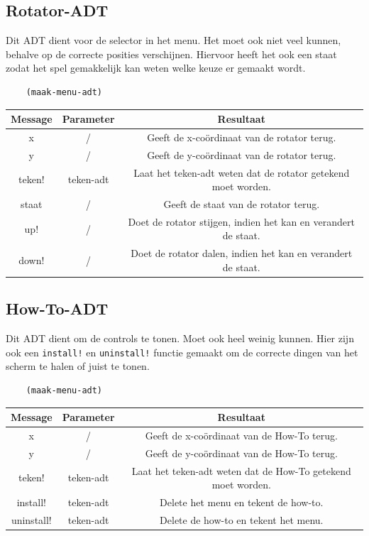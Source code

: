 \documentclass[]{article}
\begin{document}
\subsection{Rotator-ADT}
Dit ADT dient voor de selector in het menu. Het moet ook niet veel kunnen, behalve op de correcte posities verschijnen. Hiervoor heeft het ook een staat zodat het spel gemakkelijk kan weten welke keuze er gemaakt wordt. 
\begin{center}
	\begin{lstlisting}
	(maak-menu-adt)
	\end{lstlisting}
	\begin{tabular}{|c|c|c|}
		\hline  \textbf{Message} &\textbf{Parameter} & \textbf{Resultaat}  \\
			\hline x & /&Geeft de x-co\"{o}rdinaat van de rotator terug. \\
			\hline y & /&Geeft de y-co\"{o}rdinaat van de rotator terug. \\
			\hline teken! &teken-adt& Laat het teken-adt weten dat de rotator getekend moet worden. \\
			\hline staat & / & Geeft de staat van de rotator terug. \\
			\hline up! & / & Doet de rotator stijgen, indien het kan en verandert de staat. \\ 
			\hline down! & / & Doet de rotator dalen, indien het kan en verandert de staat. \\ 
		\hline
		\end{tabular}
	\end{center}
\subsection{How-To-ADT}
Dit ADT dient om de controls te tonen. Moet ook heel weinig kunnen. Hier zijn ook een \texttt{install!} en \texttt{uninstall!} functie gemaakt om de correcte dingen van het scherm te halen of juist te tonen. 
\begin{center}
	\begin{lstlisting}
	(maak-menu-adt)
	\end{lstlisting}
	\begin{tabular}{|c|c|c|}
		\hline  \textbf{Message} &\textbf{Parameter} & \textbf{Resultaat}  \\
		\hline x & /&Geeft de x-co\"{o}rdinaat van de How-To terug. \\
		\hline y & /&Geeft de y-co\"{o}rdinaat van de How-To terug. \\
		\hline  teken! &teken-adt& Laat het teken-adt weten dat de How-To getekend moet worden. \\
		\hline install! & teken-adt& Delete het menu en tekent de how-to. \\
		\hline uninstall! & teken-adt & Delete de how-to en tekent het menu. \\
		\hline 
		\end{tabular}
	\end{center}\
\end{document}
